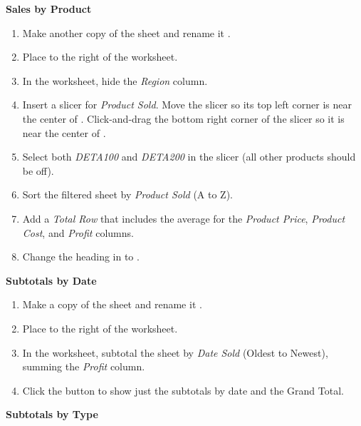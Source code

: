\noindent
\textbf{Sales by Product}

\begin{enumbox}
	\begin{enumerate}
		\item Make another copy of the  sheet and rename it . 
		\item Place  to the right of the  worksheet. 
		\item In the  worksheet, hide the \textit{Region} column.
		\item Insert a slicer for \textit{Product Sold}. Move the slicer so its top left corner is near the center of . Click-and-drag the bottom right corner of the slicer so it is near the center of .
		\item Select both \textit{DETA100} and \textit{DETA200} in the slicer (all other products should be off). 
		\item Sort the filtered sheet by \textit{Product Sold} (A to Z). 
		\item Add a \textit{Total Row} that includes the average for the \textit{Product Price}, \textit{Product Cost}, and \textit{Profit} columns. 
		\item Change the heading in  to .
	\end{enumerate}
\end{enumbox}
	
\noindent
\textbf{Subtotals by Date}

\begin{enumbox}
	\begin{enumerate}
		\item Make a copy of the  sheet and rename it . 
		\item Place  to the right of the  worksheet. 
		\item In the  worksheet, subtotal the sheet by \textit{Date Sold} (Oldest to Newest), summing the \textit{Profit} column. 
		\item Click the  button to show just the subtotals by date and the Grand Total.
	\end{enumerate}
\end{enumbox}
	
\noindent
\textbf{Subtotals by Type}

